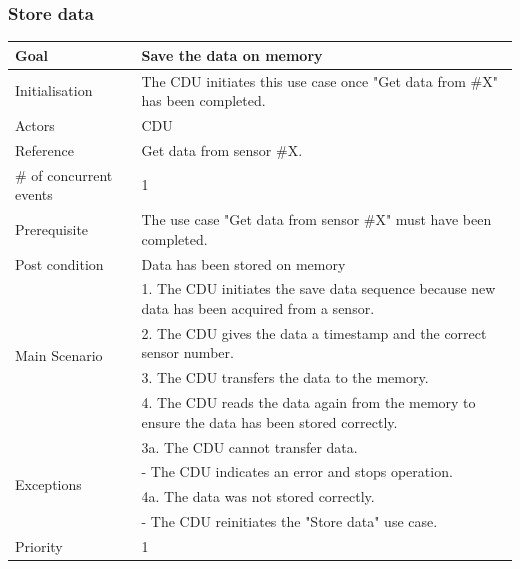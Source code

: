 \subsubsection{Store data}
\begin{table}[H]
	\centering
	\begin{tabular}{|l|p{10cm}|}
	\hline
	Goal 							& Save the data on memory \\ \hline
	Initialisation 					& The CDU initiates this use case once "Get data from \#X" has been completed. \\ \hline
	\multirow{1}{*}{Actors} 		& CDU \\ \hline
	Reference 						& Get data from sensor \#X. \\ \hline
	\# of concurrent events 		& 1 \\ \hline
	Prerequisite  					& The use case "Get data from sensor \#X" must have been completed. \\ \hline
	Post condition 					& Data has been stored on memory \\ \hline
	\multirow{4}{*}{Main Scenario} 	& 1. The CDU initiates the save data sequence because new data has been acquired from a sensor. \\
									& 2. The CDU gives the data a timestamp and the correct sensor number.\\
									& 3. The CDU transfers the data to the memory.\\ 
									& 4. The CDU reads the data again from the memory to ensure the data has been stored correctly. \\ \hline
	\multirow{4}{*}{Exceptions} & 3a. The CDU cannot transfer data. \\ 
								& - The CDU indicates an error and stops operation.\\											& 4a. The data was not stored correctly. \\
								& - The CDU reinitiates the "Store data" use case.\\\hline
	Priority					& 1\\\hline
	\end{tabular}
\end{table}

